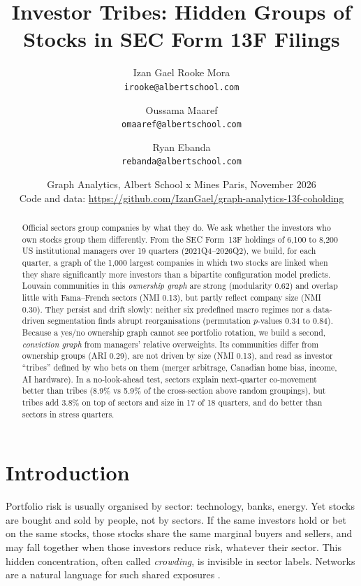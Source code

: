 \documentclass[10pt,a4paper]{article}
\title{Investor Tribes: Hidden Groups of Stocks in SEC Form 13F Filings}
\author{
  Izan Gael Rooke Mora\\
  \texttt{irooke@albertschool.com}%
  \and
  Oussama Maaref\\
  \texttt{omaaref@albertschool.com}%
  \and
  Ryan Ebanda\\
  \texttt{rebanda@albertschool.com}
}
\date{Graph Analytics, Albert School x Mines Paris, November 2026\\[2pt]
Code and data: \url{https://github.com/IzanGael/graph-analytics-13f-coholding}}
\begin{document}
\maketitle

\begin{abstract}
Official sectors group companies by what they do. We ask whether the investors who own stocks group them differently. From the SEC Form~13F holdings of 6,100 to 8,200 US institutional managers over 19 quarters (2021Q4--2026Q2), we build, for each quarter, a graph of the 1,000 largest companies in which two stocks are linked when they share significantly more investors than a bipartite configuration model predicts. Louvain communities in this \emph{ownership graph} are strong (modularity 0.62) and overlap little with Fama--French sectors (NMI 0.13), but partly reflect company size (NMI 0.30). They persist and drift slowly: neither six predefined macro regimes nor a data-driven segmentation finds abrupt reorganisations (permutation $p$-values 0.34 to 0.84). Because a yes/no ownership graph cannot see portfolio rotation, we build a second, \emph{conviction graph} from managers' relative overweights. Its communities differ from ownership groups (ARI 0.29), are not driven by size (NMI 0.13), and read as investor ``tribes'' defined by who bets on them (merger arbitrage, Canadian home bias, income, AI hardware). In a no-look-ahead test, sectors explain next-quarter co-movement better than tribes (8.9\% vs 5.9\% of the cross-section above random groupings), but tribes add 3.8\% on top of sectors and size in 17 of 18 quarters, and do better than sectors in stress quarters.
\end{abstract}

\section{Introduction}
Portfolio risk is usually organised by sector: technology, banks, energy. Yet stocks are bought and sold by people, not by sectors. If the same investors hold or bet on the same stocks, those stocks share the same marginal buyers and sellers, and may fall together when those investors reduce risk, whatever their sector. This hidden concentration, often called \emph{crowding}, is invisible in sector labels. Networks are a natural language for such shared exposures \cite{newman2003}.
\end{document}
